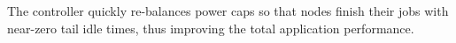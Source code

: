 \documentclass[a0,portrait]{a0poster}
\newcommand{\PAD}{\vskip 0.75cm}
\begin{document}
\begin{multicols}{2}

{
\PAD
\centering
  
  \label{fig:nlpb-sim}
\PAD
}
The controller quickly re-balances power caps so that nodes finish their jobs with near-zero tail idle times, thus improving the total application performance.


\color{SaddleBrown} %


\end{multicols}
\end{document}
